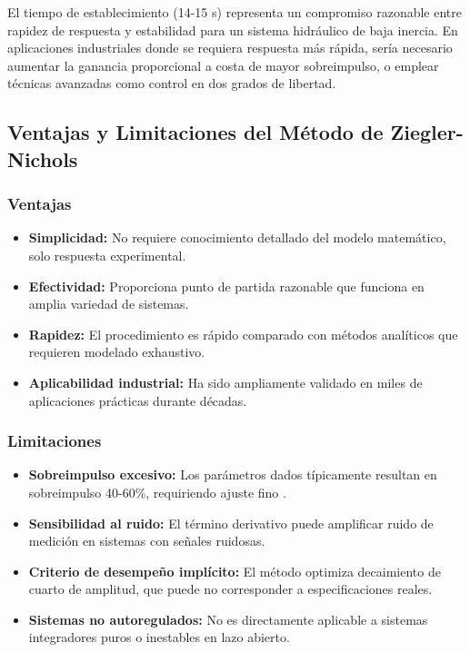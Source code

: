 \documentclass[conference]{IEEEtran}
\begin{document}
El tiempo de establecimiento (14-15 s) representa un compromiso razonable entre rapidez de respuesta y estabilidad para un sistema hidráulico de baja inercia. En aplicaciones industriales donde se requiera respuesta más rápida, sería necesario aumentar la ganancia proporcional a costa de mayor sobreimpulso, o emplear técnicas avanzadas como control en dos grados de libertad.

\subsection{Ventajas y Limitaciones del Método de Ziegler-Nichols}

\subsubsection{Ventajas}

\begin{itemize}
\item \textbf{Simplicidad:} No requiere conocimiento detallado del modelo matemático, solo respuesta experimental.
\item \textbf{Efectividad:} Proporciona punto de partida razonable que funciona en amplia variedad de sistemas.
\item \textbf{Rapidez:} El procedimiento es rápido comparado con métodos analíticos que requieren modelado exhaustivo.
\item \textbf{Aplicabilidad industrial:} Ha sido ampliamente validado en miles de aplicaciones prácticas durante décadas.
\end{itemize}

\subsubsection{Limitaciones}

\begin{itemize}
\item \textbf{Sobreimpulso excesivo:} Los parámetros dados típicamente resultan en sobreimpulso 40-60\%, requiriendo ajuste fino \cite{astrom}.
\item \textbf{Sensibilidad al ruido:} El término derivativo puede amplificar ruido de medición en sistemas con señales ruidosas.
\item \textbf{Criterio de desempeño implícito:} El método optimiza decaimiento de cuarto de amplitud, que puede no corresponder a especificaciones reales.
\item \textbf{Sistemas no autoregulados:} No es directamente aplicable a sistemas integradores puros o inestables en lazo abierto.
\end{itemize}
\end{document}
